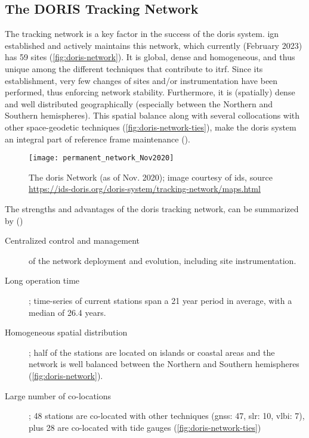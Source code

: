 \iffalse
\begin{description}
  \item[Atmospheric Studies] including troposphere () and ionosphere ()
  \item[Reference Frames] \cite{Willis2007}
  \item[Space Weather and Solar Activity] \cite{Willis2005}
  \item[Tectonics] \cite{}
\end{description}
\fi

\subsection{The DORIS Tracking Network}\label{ssec:doris-tracking-network}
The tracking network is a key factor in the success of the \gls{doris} system. 
\gls{ign} established and actively maintains this network, which currently (February
 2023) has 59 sites (\autoref{fig:doris-network}). It is global, dense 
and homogeneous, and thus unique among the different techniques that contribute to 
\gls{itrf}. Since its establishment, very few changes of sites and/or instrumentation 
have been performed, thus enforcing network stability. Furthermore, it is (spatially) 
dense and well distributed geographically (especially between the Northern and  
Southern hemispheres). This spatial balance along with several collocations with 
other space-geodetic techniques (\autoref{fig:doris-network-ties}), make the 
\gls{doris} system an integral part of reference frame maintenance (\cite{Moreaux2022}).

\begin{figure}[h]
  \centering
  \texttt{[image: permanent\_network\_Nov2020]}
  \caption{The \gls{doris} Network (as of Nov. 2020); image courtesy of \gls{ids}, source \url{https://ids-doris.org/doris-system/tracking-network/maps.html}}
  \label{fig:doris-network}
\end{figure}

The strengths and advantages of the \gls{doris} tracking network, can be summarized 
by (\cite{Soudarin2019})
\begin{description}
  \item[Centralized control and management] of the network deployment and evolution, 
    including site instrumentation.
  \item[Long operation time]; time-series of current stations span a 21 year period in average, 
    with a median of 26.4 years.
  \item[Homogeneous spatial distribution]; half of the stations are located on 
    islands or coastal areas and the network is well balanced between the 
    Northern and Southern hemispheres (\autoref{fig:doris-network}).
  \item[Large number of co-locations]; 48 stations are co-located with 
    other techniques (\gls{gnss}: 47, \gls{slr}: 10, \gls{vlbi}: 7), plus 28 are 
    co-located with tide gauges (\autoref{fig:doris-network-ties})
\end{description}

